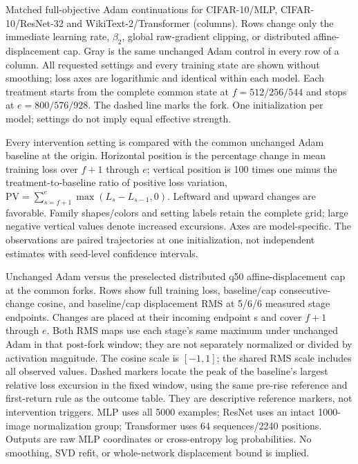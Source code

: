 \caption{Matched full-objective Adam continuations for CIFAR-10/MLP, CIFAR-10/ResNet-32 and WikiText-2/Transformer (columns). Rows change only the immediate learning rate, $\beta_2$, global raw-gradient clipping, or distributed affine-displacement cap. Gray is the same unchanged Adam control in every row of a column. All requested settings and every training state are shown without smoothing; loss axes are logarithmic and identical within each model. Each treatment starts from the complete common state at $f=512/256/544$ and stops at $e=800/576/928$. The dashed line marks the fork. One initialization per model; settings do not imply equal effective strength.}

\caption{Every intervention setting is compared with the common unchanged Adam baseline at the origin. Horizontal position is the percentage change in mean training loss over $f+1$ through $e$; vertical position is 100 times one minus the treatment-to-baseline ratio of positive loss variation, $\mathrm{PV}=\sum_{s=f+1}^{e}\max(L_s-L_{s-1},0)$. Leftward and upward changes are favorable. Family shapes/colors and setting labels retain the complete grid; large negative vertical values denote increased excursions. Axes are model-specific. The observations are paired trajectories at one initialization, not independent estimates with seed-level confidence intervals.}

\caption{Unchanged Adam versus the preselected distributed q50 affine-displacement cap at the common forks. Rows show full training loss, baseline/cap consecutive-change cosine, and baseline/cap displacement RMS at 5/6/6 measured stage endpoints. Changes are placed at their incoming endpoint s and cover $f+1$ through $e$. Both RMS maps use each stage's same maximum under unchanged Adam in that post-fork window; they are not separately normalized or divided by activation magnitude. The cosine scale is $[-1,1]$; the shared RMS scale includes all observed values. Dashed markers locate the peak of the baseline's largest relative loss excursion in the fixed window, using the same pre-rise reference and first-return rule as the outcome table. They are descriptive reference markers, not intervention triggers. MLP uses all 5000 examples; ResNet uses an intact 1000-image normalization group; Transformer uses 64 sequences/2240 positions. Outputs are raw MLP coordinates or cross-entropy log probabilities. No smoothing, SVD refit, or whole-network displacement bound is implied.}

